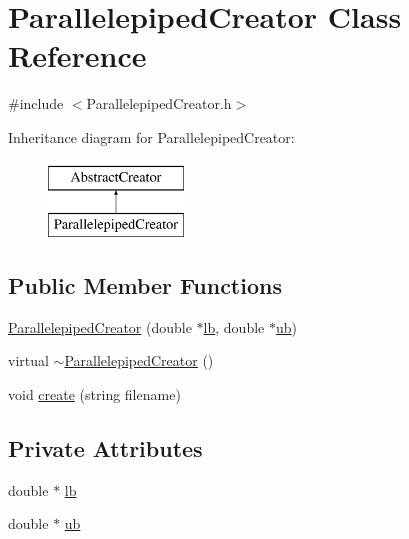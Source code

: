 \hypertarget{class_parallelepiped_creator}{}\section{Parallelepiped\+Creator Class Reference}
\label{class_parallelepiped_creator}


{\ttfamily \#include $<$Parallelepiped\+Creator.\+h$>$}

Inheritance diagram for Parallelepiped\+Creator\+:\begin{figure}[H]
\begin{center}
\leavevmode
\includegraphics[height=2.000000cm]{dd/def/class_parallelepiped_creator}
\end{center}
\end{figure}
\subsection*{Public Member Functions}
\begin{DoxyCompactItemize}
\item 
\hyperlink{class_parallelepiped_creator_a90c756a533fe6590d1ea2cd236c4762f}{Parallelepiped\+Creator} (double $\ast$\hyperlink{class_parallelepiped_creator_afbbe8ed8aca059a07b2198e4e6ced522}{lb}, double $\ast$\hyperlink{class_parallelepiped_creator_a2120f519681200f2b431439b2e022e1b}{ub})
\item 
virtual \hyperlink{class_parallelepiped_creator_a1e41ac467a6423c499401dd2e7663be7}{$\sim$\+Parallelepiped\+Creator} ()
\item 
void \hyperlink{class_parallelepiped_creator_a12a54b7a1d66ac413c30327751d8ad47}{create} (string filename)
\end{DoxyCompactItemize}
\subsection*{Private Attributes}
\begin{DoxyCompactItemize}
\item 
double $\ast$ \hyperlink{class_parallelepiped_creator_afbbe8ed8aca059a07b2198e4e6ced522}{lb}
\item 
double $\ast$ \hyperlink{class_parallelepiped_creator_a2120f519681200f2b431439b2e022e1b}{ub}
\end{DoxyCompactItemize}


